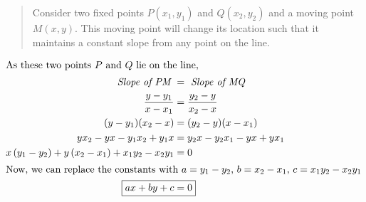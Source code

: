 \begin{center}
\end{center}

\begin{quote}
    Consider two fixed points \( P(x_1, y_1) \) and \( Q(x_2, y_2) \) and a moving point \( M(x, y) \). This moving point will change its location such that it maintains a constant slope from any point on the line.
\end{quote}

\begin{align*}
    \intertext{As these two points $P$ and $Q$ lie on the line,}
    \textit{Slope of PM } &= \textit{ Slope of MQ} \\
    \frac{y - y_1}{x - x_1} &= \frac{y_2 - y}{x_2 - x} \\
    (y-y_1)(x_2-x) &= (y_2-y)(x-x_1) \\
    yx_2 - yx - y_1x_2 + y_1x &= y_2x - y_2x_1 - yx + yx_1 \\
    x\left(y_1-y_2\right) + y\left(x_2-x_1\right) + x_1y_2 - x_2y_1 &= 0 \\
    \intertext{Now, we can replace the constants with \( a = y_1 - y_2 \), \( b = x_2 - x_1 \), \( c = x_1y_2 - x_2y_1 \)}
    \Aboxed{ax + by + c &= 0}
\end{align*}

